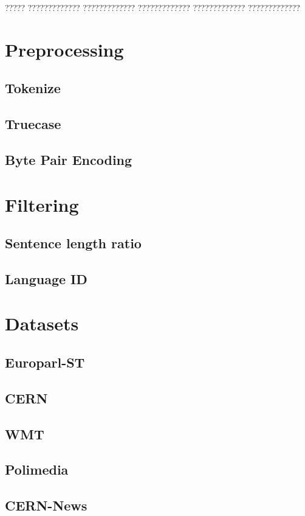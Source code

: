 \documentclass[11pt,english,listoffigures,listoftables]{tfgetsinf}
\begin{document}
????? ????????????? ????????????? ????????????? ????????????? ?????????????

\section{Preprocessing}
\subsection{Tokenize}
\subsection{Truecase}
\subsection{Byte Pair Encoding}

\section{Filtering}
\subsection{Sentence length ratio}
\subsection{Language ID}

\section{Datasets}
\subsection{Europarl-ST}
\subsection{CERN}
\subsection{WMT}
\subsection{Polimedia}
\subsection{CERN-News}
\end{document}
